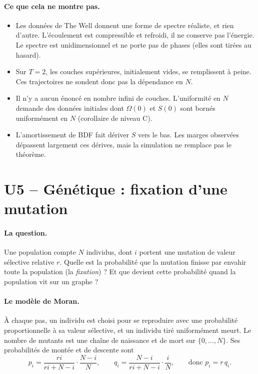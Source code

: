 \paragraph{Ce que cela ne montre pas.}
\begin{itemize}
\item Les données de The Well donnent une forme de spectre réaliste, et rien d'autre. L'écoulement est compressible
et refroidi, il ne conserve pas l'énergie. Le spectre est unidimensionnel et ne porte pas de phases (elles sont
tirées au hasard).
\item Sur $T=2$, les couches supérieures, initialement vides, se remplissent à peine. Ces trajectoires ne sondent donc
pas la dépendance en $N$.
\item Il n'y a aucun énoncé en nombre infini de couches. L'uniformité en $N$ demande des données initiales dont
$\Omega(0)$ et $S(0)$ sont bornés uniformément en $N$ (corollaire de niveau C).
\item L'amortissement de BDF fait dériver $S$ vers le bas. Les marges observées dépassent largement ces dérives,
mais la simulation ne remplace pas le théorème.
\end{itemize}

\section{U5 -- Génétique : fixation d'une mutation}\label{ch5:U5}

\paragraph{La question.} Une population compte $N$ individus, dont $i$ portent une mutation de valeur sélective
relative $r$. Quelle est la probabilité que la mutation finisse par envahir toute la population (la
\emph{fixation}) ? Et que devient cette probabilité quand la population vit sur un graphe ?

\paragraph{Le modèle de Moran.} À chaque pas, un individu est choisi pour se reproduire avec une probabilité
proportionnelle à sa valeur sélective, et un individu tiré uniformément meurt. Le nombre de mutants est une chaîne de
naissance et de mort sur $\{0,\dots,N\}$. Ses probabilités de montée et de descente sont
\[p_i=\frac{ri}{ri+N-i}\cdot\frac{N-i}{N},\qquad q_i=\frac{N-i}{ri+N-i}\cdot\frac iN,\qquad\text{donc } p_i=r\,q_i .\]

